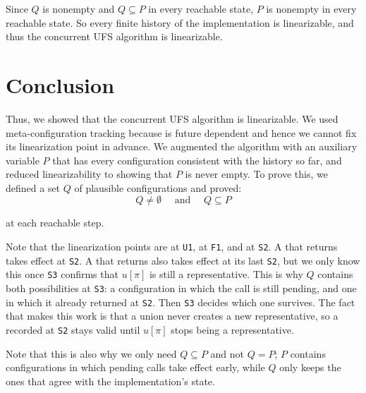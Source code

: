 \documentclass[12pt]{amsproc}
\begin{document}
Since $Q$ is nonempty and $Q\subseteq P$ in every reachable state, $P$ is nonempty in every reachable state. So every finite history of the implementation is linearizable, and thus the concurrent UFS algorithm is linearizable.

\newpage 

\section{Conclusion}

Thus, we showed that the concurrent UFS algorithm is linearizable. We used meta-configuration tracking because \SameSet{} is future dependent and hence we cannot fix its linearization point in advance. We augmented the algorithm with an auxiliary variable $P$ that has every configuration consistent with the history so far, and reduced linearizability to showing that $P$ is never empty. To prove this, we defined a set $Q$ of plausible configurations and proved:
\[Q \neq \emptyset \quad \text{ and } \quad  Q\subseteq P \]

at each reachable step.  

Note that the linearization points are \Unite{} at \texttt{U1}, \Find{} at \texttt{F1}, and \SameSet{} at \texttt{S2}. A \SameSet{} that returns \True{} takes effect at \texttt{S2}. A \SameSet{} that returns \False{} also takes effect at its last \texttt{S2}, but we only know this once \texttt{S3} confirms that $u[\pi]$ is still a representative. This is why $Q$ contains both possibilities at \texttt{S3}: a configuration in which the call is still pending, and one in which it already returned \False{} at \texttt{S2}. Then \texttt{S3} decides which one survives. 
The fact that makes this work is that a union never creates a new representative, so a \False{} recorded at \texttt{S2} stays valid until $u[\pi]$ stops being a representative. 

Note that this is also why we only need $Q\subseteq P$ and not $Q=P$; $P$ contains configurations in which pending calls take effect early, while $Q$ only keeps the ones that agree with the implementation's state.
\end{document}
